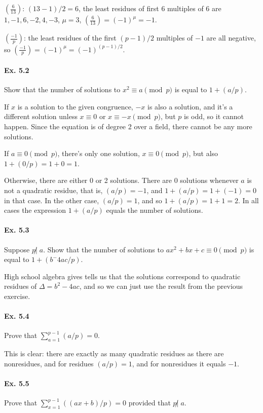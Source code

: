 \documentclass[notitlepage]{article}
\theoremstyle{definition}
\begin{document}
$\left(\frac{6}{13}\right)$: $(13-1)/2 = 6$, the least residues of
first $6$ multiples of $6$ are $1, -1, 6, -2, 4, -3$, $\mu = 3$,
$\left(\frac{6}{13}\right) = (-1)^\mu = -1$.

$\left(\frac{-1}{p}\right)$: the least residues of the first $(p-1)/2$
multiples of $-1$ are all negative, so $\left(\frac{-1}{p}\right) =
(-1)^\mu = (-1)^{(p-1)/2}$.

\paragraph{Ex. 5.2}
Show that the number of solutions to $x^2 \equiv a \pmod p$ is equal
to $1 + (a/p)$.

If $x$ is a solution to the given congruence, $-x$ is also a solution,
and it's a different solution unless $x \equiv 0$ or $x \equiv -x
\pmod p$, but $p$ is odd, so it cannot happen. Since the equation is
of degree 2 over a field, there cannot be any more solutions.

If $a \equiv 0 \pmod p$, there's only one solution, $x \equiv 0 \pmod
p$, but also $1+(0/p) = 1+0 = 1$.

Otherwise, there are either 0 or 2 solutions. There are 0 solutions
whenever $a$ is not a quadratic residue, that is, $(a/p) = -1$, and $1
+ (a/p) = 1 + (-1) = 0$ in that case. In the other case, $(a/p) = 1$,
and so $1 + (a/p) = 1 + 1 = 2$. In all cases the expression $1 +
(a/p)$ equals the number of solutions.

\paragraph{Ex. 5.3}
Suppose $p \not | \; a$. Show that the number of solutions to $a x^2 +
bx + c \equiv 0 \pmod p$ is equal to $1 + (b^ - 4ac/p)$.

High school algebra gives tells us that the solutions correspond to
quadratic residues of $\Delta = b^2 - 4ac$, and so we can just use the
result from the previous exercise.

\paragraph{Ex. 5.4}
Prove that $\sum_{a=1}^{p-1} (a/p) = 0$.

This is clear: there are exactly as many quadratic residues as there
are nonresidues, and for residues $(a/p) = 1$, and for nonresidues it
equals $-1$.

\paragraph{Ex. 5.5}
Prove that $\sum_{x=1}^{p-1} ((ax + b)/p) = 0$ provided that $p \not | \; a$.
\end{document}

